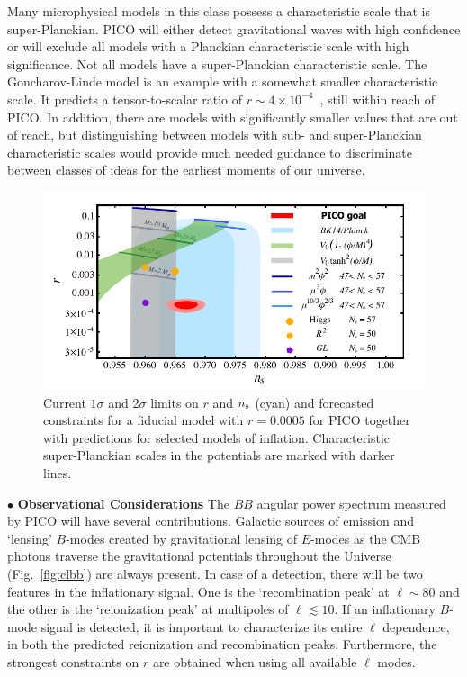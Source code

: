 \documentclass[PICOReport.tex]{subfiles}
\begin{document}
Many microphysical models in this class possess a characteristic scale that is super-Planckian. PICO will either detect gravitational waves with high confidence or will exclude all models with a Planckian characteristic scale with high significance. Not all models have a super-Planckian characteristic scale. The Goncharov-Linde model is an example with a somewhat smaller characteristic scale. It predicts a tensor-to-scalar ratio of $r\sim 4\times 10^{-4}$~\cite{Goncharov:1983mw}, still within reach of PICO. In addition, there are models with significantly smaller values that are out of reach, but distinguishing between models with sub- and super-Planckian characteristic scales would provide much needed guidance to discriminate between classes of ideas for the earliest moments of our universe.


\begin{figure}[!thb]
\parbox{4.5in}{\centerline{
\includegraphics[width=4.5in]{images/nsrlabeledrp0005_PICOv4p1.pdf}}}
\parbox{1.8in}{
\caption{\captiontext  Current $1\sigma$ and 2$\sigma$ limits on $r$ and $n_{\rm s}$ (cyan) and forecasted constraints for a fiducial model with $r = 0.0005$ for PICO together with predictions for selected models of inflation. Characteristic super-Planckian scales in the potentials are marked with darker lines. }
\label{fig:nsr}}
\end{figure}

\noindent$\bullet$ {\bf Observational Considerations} \hspace{0.1in} The $BB$ angular power spectrum measured by PICO will have several contributions. Galactic sources of emission and `lensing' $B$-modes created by gravitational lensing of $E$-modes as the CMB photons traverse the gravitational potentials throughout the Universe (Fig.~\ref{fig:clbb}) are always present. In case of a detection, there will be two features in the inflationary signal. One is the `recombination peak' at $\ell \sim 80$ and the other is the `reionization peak' at multipoles of $\ell\lesssim 10$.  If an inflationary $B$-mode signal is detected, it is important to characterize its entire $\ell$ dependence, in both the predicted reionization and recombination peaks. Furthermore, the strongest constraints on $r$ are obtained when using all available $\ell$ modes.  
\end{document}

